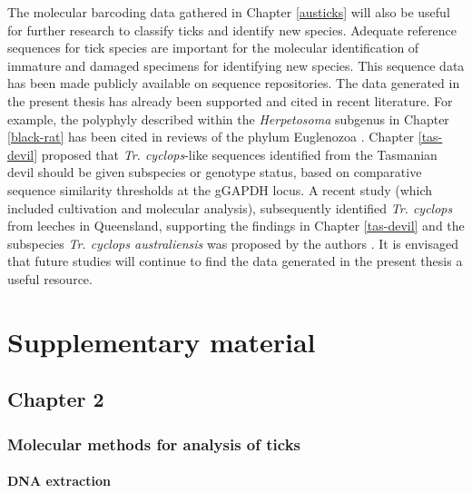 \documentclass[a4paper, nobind]{templates/ociamthesis}
\begin{document}
The molecular barcoding data gathered in Chapter \ref{austicks} will also be useful for further research to classify ticks and identify new species. Adequate reference sequences for tick species are important for the molecular identification of immature and damaged specimens for identifying new species.
This sequence data has been made publicly available on sequence repositories.
The data generated in the present thesis has already been supported and cited in recent literature.
For example, the polyphyly described within the \emph{Herpetosoma} subgenus in Chapter \ref{black-rat} has been cited in reviews of the phylum Euglenozoa \autocite{kostygovEuglenozoaTaxonomyDiversity2021}.
Chapter \ref{tas-devil} proposed that \emph{Tr. cyclops}-like sequences identified from the Tasmanian devil should be given subspecies or genotype status, based on comparative sequence similarity thresholds at the gGAPDH locus.
A recent study (which included cultivation and molecular analysis), subsequently identified \emph{Tr. cyclops} from leeches in Queensland, supporting the findings in Chapter \ref{tas-devil} and the subspecies \emph{Tr. cyclops australiensis} was proposed by the authors \autocite{ellisNewSubspeciesTrypanosoma2021}.
It is envisaged that future studies will continue to find the data generated in the present thesis a useful resource.

\startappendices

\hypertarget{supplementary-material}{%
\chapter{Supplementary material}\label{supplementary-material}}

\hypertarget{ch2supp}{%
\section{Chapter 2}\label{ch2supp}}

\hypertarget{molecular-methods-for-analysis-of-ticks}{%
\subsection{Molecular methods for analysis of ticks}\label{molecular-methods-for-analysis-of-ticks}}

\hypertarget{dna-extraction-1}{%
\subsubsection{DNA extraction}\label{dna-extraction-1}}
\end{document}
